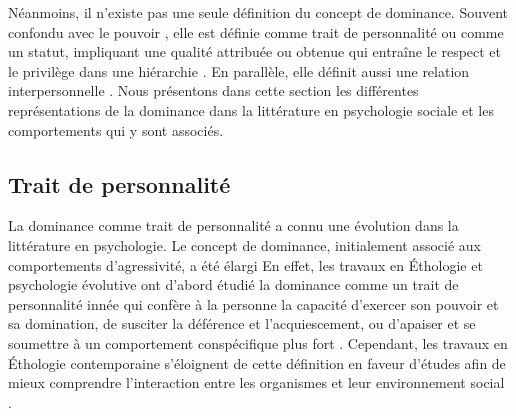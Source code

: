 	Néanmoins, il n'existe pas une seule définition du concept de dominance. Souvent confondu avec le pouvoir  \cite{burgoon2000interactionist,dunbar2005perceptions}, elle est définie comme trait de personnalité ou comme un statut, impliquant une qualité attribuée ou obtenue qui entraîne le respect et le privilège dans une hiérarchie \cite{hall2005nonverbal}. En parallèle, elle définit aussi une relation interpersonnelle \cite{burgoon2006nonverbal,burgoon1998nature}. Nous présentons dans cette section les différentes représentations de la dominance dans la littérature en psychologie sociale et les comportements qui y sont associés.  
	
\subsection{Trait de personnalité}


La dominance comme trait de personnalité a connu une évolution dans la littérature en psychologie. Le concept de dominance, initialement associé aux comportements d'agressivité, a été élargi \cite{burgoon1995interpersonal}
En effet, les travaux en Éthologie et psychologie évolutive ont d'abord étudié la dominance comme un trait de personnalité innée qui confère à la personne la capacité d'exercer son pouvoir et sa domination, de susciter la déférence et l'acquiescement, ou d'apaiser et se soumettre à un comportement conspécifique plus fort \cite{keltner1995signs,burgoon2006nonverbal}. Cependant, les travaux en Éthologie contemporaine s'éloignent de cette définition en faveur d'études afin de mieux comprendre l'interaction entre les organismes et leur environnement social \cite{burgoon2006nonverbal}.

